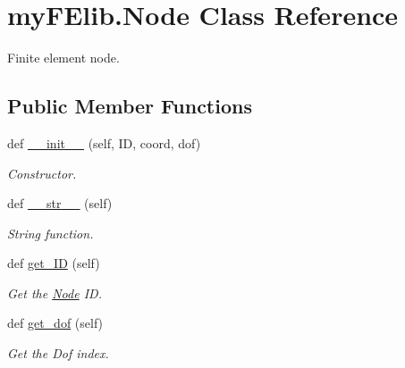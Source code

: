 \hypertarget{classmyFElib_1_1Node}{}\section{my\+F\+Elib.\+Node Class Reference}
\label{classmyFElib_1_1Node}


Finite element node.  


\subsection*{Public Member Functions}
\begin{DoxyCompactItemize}
\item 
def \mbox{\hyperlink{classmyFElib_1_1Node_ad215dccab815671eb21635446c121b75}{\+\_\+\+\_\+init\+\_\+\+\_\+}} (self, ID, coord, dof)
\begin{DoxyCompactList}\small\item\em Constructor. \end{DoxyCompactList}\item 
\mbox{\label{classmyFElib_1_1Node_a28959da391209a6355c4aad427f0cc31}} 
def \mbox{\hyperlink{classmyFElib_1_1Node_a28959da391209a6355c4aad427f0cc31}{\+\_\+\+\_\+str\+\_\+\+\_\+}} (self)
\begin{DoxyCompactList}\small\item\em String function. \end{DoxyCompactList}\item 
\mbox{\label{classmyFElib_1_1Node_a497fb4bd604a9306385a3a6461c88f90}} 
def \mbox{\hyperlink{classmyFElib_1_1Node_a497fb4bd604a9306385a3a6461c88f90}{get\+\_\+\+ID}} (self)
\begin{DoxyCompactList}\small\item\em Get the \mbox{\hyperlink{classmyFElib_1_1Node}{Node}} ID. \end{DoxyCompactList}\item 
\mbox{\label{classmyFElib_1_1Node_a2ee06ecc25845ce406627023efb514fd}} 
def \mbox{\hyperlink{classmyFElib_1_1Node_a2ee06ecc25845ce406627023efb514fd}{get\+\_\+dof}} (self)
\begin{DoxyCompactList}\small\item\em Get the Dof index. \end{DoxyCompactList}\item 

\end{DoxyCompactItemize}
